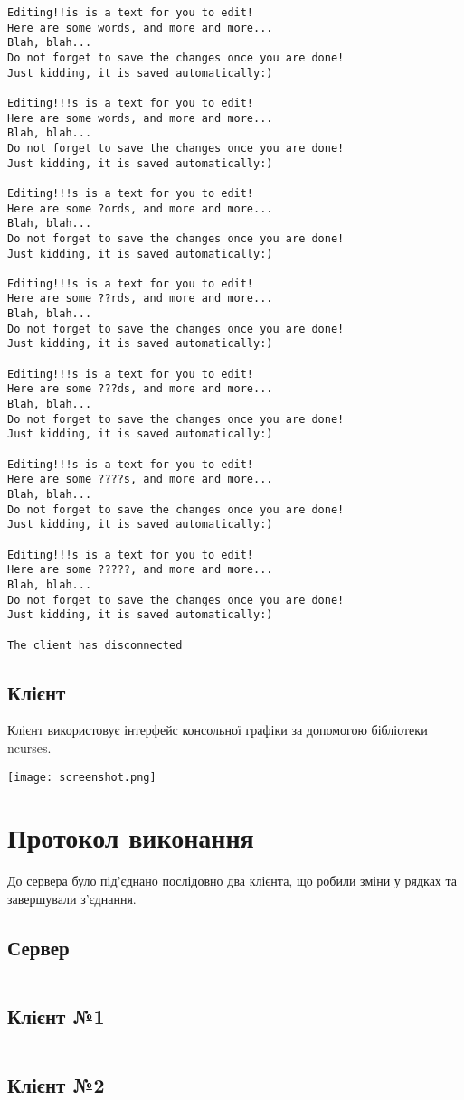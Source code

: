 \documentclass[a4paper]{article}
\begin{document}
\begin{verbatim}
Editing!!is is a text for you to edit!
Here are some words, and more and more...
Blah, blah...
Do not forget to save the changes once you are done!
Just kidding, it is saved automatically:)

Editing!!!s is a text for you to edit!
Here are some words, and more and more...
Blah, blah...
Do not forget to save the changes once you are done!
Just kidding, it is saved automatically:)

Editing!!!s is a text for you to edit!
Here are some ?ords, and more and more...
Blah, blah...
Do not forget to save the changes once you are done!
Just kidding, it is saved automatically:)

Editing!!!s is a text for you to edit!
Here are some ??rds, and more and more...
Blah, blah...
Do not forget to save the changes once you are done!
Just kidding, it is saved automatically:)

Editing!!!s is a text for you to edit!
Here are some ???ds, and more and more...
Blah, blah...
Do not forget to save the changes once you are done!
Just kidding, it is saved automatically:)

Editing!!!s is a text for you to edit!
Here are some ????s, and more and more...
Blah, blah...
Do not forget to save the changes once you are done!
Just kidding, it is saved automatically:)

Editing!!!s is a text for you to edit!
Here are some ?????, and more and more...
Blah, blah...
Do not forget to save the changes once you are done!
Just kidding, it is saved automatically:)

The client has disconnected
\end{verbatim}

\subsection{Клієнт}
Клієнт використовує інтерфейс консольної графіки за допомогою бібліотеки ncurses.

\begin{center}
  \texttt{[image: screenshot.png]}
\end{center}

\section{Протокол виконання}

До сервера було під'єднано послідовно два клієнта, що робили зміни у рядках та завершували
з'єднання.

\subsection{Сервер}
\inputminted[fontsize=\footnotesize, breaklines]{text}{server.log}

\subsection{Клієнт №1}
\inputminted[fontsize=\footnotesize, breaklines]{text}{client1.log}

\subsection{Клієнт №2}
\inputminted[fontsize=\footnotesize, breaklines]{text}{client2.log}
\end{document}
